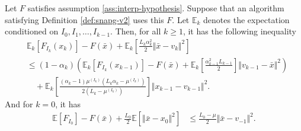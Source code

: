 \documentclass[12pt]{article}
\begin{document}
        \begin{theorem}\label{thm:snapg2-one-step}
            Let $F$ satisfies assumption \ref{ass:interp-hypothesis}. 
            Suppose that an algorithm satisfying Definition \ref{def:snapg-v2} uses this $F$. 
            Let $\mathbb E_k$ denotes the expectation conditioned on $I_0, I_1, \ldots, I_{k - 1}$. 
            Then, for all $k \ge 1$, it has the following inequality 
            \begin{align*}
                & \mathbb E_k\left[F_{I_k}(x_{k})\right] 
                - F(\bar x) 
                + \mathbb E_k\left[
                    \frac{L_k\alpha_k^2}{2}\Vert \bar x - v_k\Vert^2 
                \right]
                \\
                &\le 
                (1 - \alpha_k)\left(
                        \mathbb E_k \left[F_{I_k}(x_{k - 1})\right] 
                        - F(\bar x)
                        + \mathbb E_k \left[\frac{\alpha_{k - 1}^2L_{k - 1}}{2}\right]\Vert v_{k - 1} - \bar x\Vert^2
                \right)
                    \\ &\quad 
                    + \mathbb E_k\left[
                        \frac{(\alpha_k - 1)\mu^{(I_k)}\left(L_k\alpha_k - \mu^{(I_k)}\right)}{2\left(L_k - \mu^{(I_k)}\right)}
                    \right]\Vert x_{k - 1} - v_{k - 1} \Vert^2. 
            \end{align*}
            And for $k = 0$, it has 
            \begin{align*}
                \mathbb E \left[ F_{I_0}\right] - F(\bar x) 
                + \frac{L_0}{2}\mathbb E \left[\Vert \bar x - x_0\Vert^2\right]
                &\le \frac{L_0 - \mu}{2}\Vert \bar x - v_{-1}\Vert^2. 
            \end{align*}
        \end{theorem}
\end{document}
